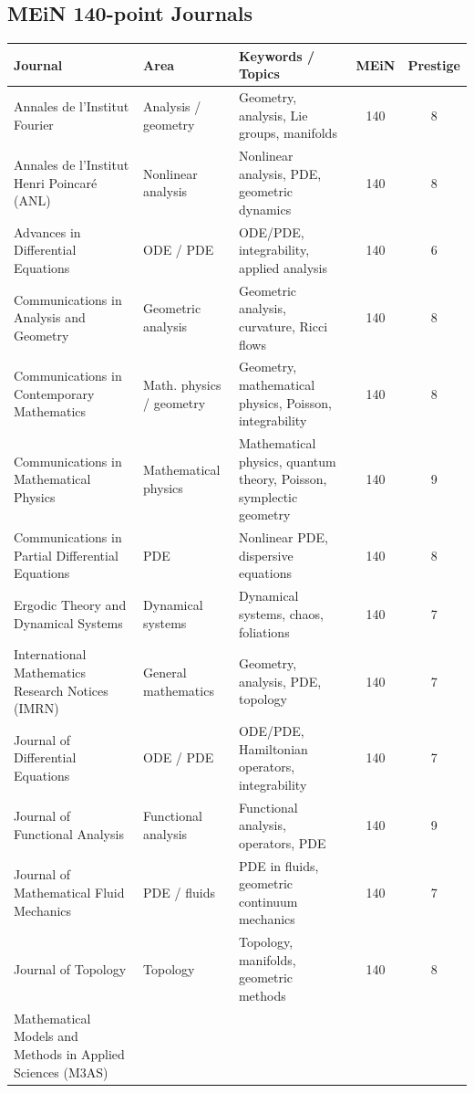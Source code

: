 \documentclass[11pt]{article}
\begin{document}
\subsection*{MEiN 140-point Journals}

\begin{longtable}{p{4.6cm} p{3.6cm} p{4.8cm} c c}
\toprule
\textbf{Journal} & \textbf{Area} & \textbf{Keywords / Topics} & \textbf{MEiN} & \textbf{Prestige} \\
\midrule
Annales de l'Institut Fourier &
Analysis / geometry &
Geometry, analysis, Lie groups, manifolds &
140 & 8 \\
Annales de l'Institut Henri Poincar\'e (ANL) &
Nonlinear analysis &
Nonlinear analysis, PDE, geometric dynamics &
140 & 8 \\
Advances in Differential Equations &
ODE / PDE &
ODE/PDE, integrability, applied analysis &
140 & 6 \\
Communications in Analysis and Geometry &
Geometric analysis &
Geometric analysis, curvature, Ricci flows &
140 & 8 \\
Communications in Contemporary Mathematics &
Math. physics / geometry &
Geometry, mathematical physics, Poisson, integrability &
140 & 8 \\
Communications in Mathematical Physics &
Mathematical physics &
Mathematical physics, quantum theory, Poisson, symplectic geometry &
140 & 9 \\
Communications in Partial Differential Equations &
PDE &
Nonlinear PDE, dispersive equations &
140 & 8 \\
Ergodic Theory and Dynamical Systems &
Dynamical systems &
Dynamical systems, chaos, foliations &
140 & 7 \\
International Mathematics Research Notices (IMRN) &
General mathematics &
Geometry, analysis, PDE, topology &
140 & 7 \\
Journal of Differential Equations &
ODE / PDE &
ODE/PDE, Hamiltonian operators, integrability &
140 & 7 \\
Journal of Functional Analysis &
Functional analysis &
Functional analysis, operators, PDE &
140 & 9 \\
Journal of Mathematical Fluid Mechanics &
PDE / fluids &
PDE in fluids, geometric continuum mechanics &
140 & 7 \\
Journal of Topology &
Topology &
Topology, manifolds, geometric methods &
140 & 8 \\
Mathematical Models and Methods in Applied Sciences (M3AS) &

\end{longtable}
\end{document}
